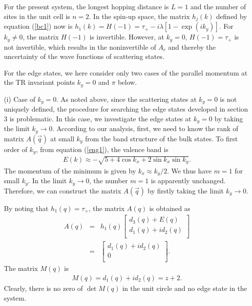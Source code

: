 \documentclass[aps,pra,amsmath,twocolumn,showpacs,bibnotes,10pt]{revtex4-1}
\begin{document}
For the present system, the longest hopping distance is $L = 1$ and the number of sites in the unit cell is $n = 2$. In the spin-up space, the matrix $h_j(k)$ defined by equation (\ref{bc1}) now is $h_1(k) = H(-1) = \tau_+  -i\lambda[1-\exp(ik_y)]$. For $k_y \ne 0$, the matrix $H(-1)$ is invertible. However, at $k_y = 0$, $H(-1) = \tau_+$ is not invertible, which results in the noninvertible of $A_c$ and thereby the uncertainty of the wave functions of scattering states.

For the edge states, we here consider only two cases of the parallel momentum at the TR invariant points $k_y =0$ and $\pi$ below. 
 
(i) Case of $k_y = 0$. As noted above, since the scattering states at $k_y = 0$ is not uniquely defined, the procedure for searching the edge states developed in section 3 is problematic. In this case, we investigate the edge states at $k_y = 0$ by taking the limit $k_y \to 0$. According to our analysis, first, we need to know the rank of matrix $A(\vec q)$ at small $k_y$ from the band structure of the bulk states. To first order of $k_y$, from equation (\ref{eng1}), the valence band is
\begin{eqnarray}
E(k) \approx -\sqrt{5+4\cos k_x+2\sin k_x\sin k_y}. \label{engy}
\end{eqnarray}
The momentum of the minimum is given by $k_x \approx k_y/2$. We thus have $m = 1$ for small $k_y$. In the limit $k_y \to 0$, the number $m = 1$ is apparently unchanged. Therefore, we can construct the matrix $A(\vec q)$ by firstly taking the limit $k_y \to 0$.

By noting that $h_1(q) = \tau_+$, the matrix $A(q)$ is obtained as
\begin{eqnarray}
A(q) &=& h_1(q)\begin{bmatrix}
	d_3(q)+E(q)\\
	d_1(q)+id_2(q)\\
\end{bmatrix}  \nonumber\\
&=& \begin{bmatrix} 
	d_1(q)+id_2(q)\\
	0\\
\end{bmatrix}.\nonumber
\end{eqnarray}
The matrix $M(q)$ is
\begin{eqnarray}
M(q) = d_1(q)+id_2(q) = z+2. \nonumber
\end{eqnarray}
Clearly, there is no zero of $\det M(q)$ in the unit circle and no edge state in the system.
\end{document}
